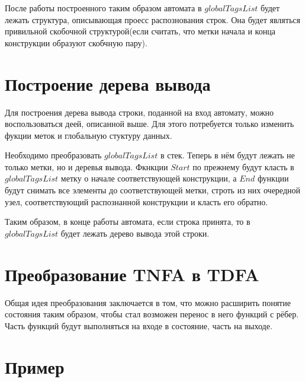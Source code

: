 \documentclass{article}
\begin{document}
\clearpage

После работы построенного таким образом автомата в $globalTagsList$ будет лежать структура, описывающая проесс распознования строк. Она будет являться привильной скобочной структурой(если считать, что метки начала и конца конструкции образуют скобчную пару). 


\section{Построение дерева вывода}

Для построения дерева вывода строки, поданной на вход автомату, можно воспользоваться деей, описанной выше. Для этого потребуется только изменить фукции меток и глобальную стуктуру данных. 

Необходимо преобразовать $globalTagsList$ в стек. Теперь в нём будут лежать не только метки, но и деревья вывода. Фкнкции $Start$ по прежнему будут класть в $globalTagsList$ метку о начале соответствующей конструкции, а $End$ функции будут снимать все элементы до соответствующей метки, строть из них очередной узел, соответствующий распознанной конструкции и класть его обратно.

Таким образом, в конце работы автомата, если строка принята, то в $globalTagsList$ будет лежать дерево вывода этой строки.

\section{Преобразование TNFA в TDFA}

Общая идея преобразования заключается в том, что можно расширить понятие состояния таким образом, чтобы стал возможен перенос в него функций с рёбер. Часть функций будут выполняться на входе в состояние, часть на выходе. 



\section{Пример}

  \begin{flushleft}
        
  \end{flushleft}

\clearpage

  \begin{flushleft}
        
  \end{flushleft}

  \begin{flushleft}
        
  \end{flushleft}
\end{document}

